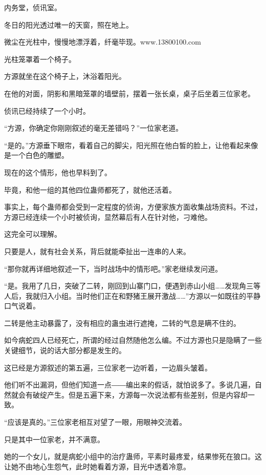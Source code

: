 
\begin{this_body}

内务堂，侦讯室。

冬日的阳光透过唯一的天窗，照在地上。

微尘在光柱中，慢慢地漂浮着，纤毫毕现。www.13800100.com

光柱笼罩着一个椅子。

方源就坐在这个椅子上，沐浴着阳光。

在他的对面，阴影和黑暗笼罩的墙壁前，摆着一张长桌，桌子后坐着三位家老。

侦讯已经持续了一个小时。

“方源，你确定你刚刚叙述的毫无差错吗？”一位家老道。

“是的。”方源垂下眼帘，看着自己的脚尖，阳光照在他白皙的脸上，让他看起来像是一个白色的雕塑。

现在的这个情形，他也早料到了。

毕竟，和他一组的其他四位蛊师都死了，就他还活着。

事实上，每个蛊师都会受到一定程度的侦询，方便家族方面收集战场资料。不过，方源已经连续一个小时被侦询，显然幕后有人在针对他，刁难他。

这完全可以理解。

只要是人，就有社会关系，背后就能牵扯出一连串的人来。

“那你就再详细地叙述一下，当时战场中的情形吧。”家老继续发问道。

“是。我用了几日，突破了二转，刚回到山寨门口，便遇到赤山小组……发现角三等人后，我就归入小组。当时他们正在和野猪王展开激战……”方源以一如既往的平静口气说着。

二转是他主动暴露了，没有相应的蛊虫进行遮掩，二转的气息是瞒不住的。

如今病蛇四人已经死亡，所谓的经过自然随他怎么编。不过方源也只是隐瞒了一些关键细节，说的话大部分都是发生的。

这已经是方源叙述的第五遍，三位家老一边听着，一边眉头皱着。

他们听不出漏洞，但他们知道一点――编出来的假话，就怕说多了。多说几遍，自然就会有破绽产生。但是五遍下来，方源每一次说法都有些差别，但是内容却一致。

“应该是真的。”三位家老相互对望了一眼，用眼神交流着。

只是其中一位家老，并不满意。

她的一个女儿，就是病蛇小组中的治疗蛊师，平素时最疼爱，结果惨死在狼口。这让她不由地心生怨气，此时她看着方源，目光中透着冷意。


\end{this_body}
